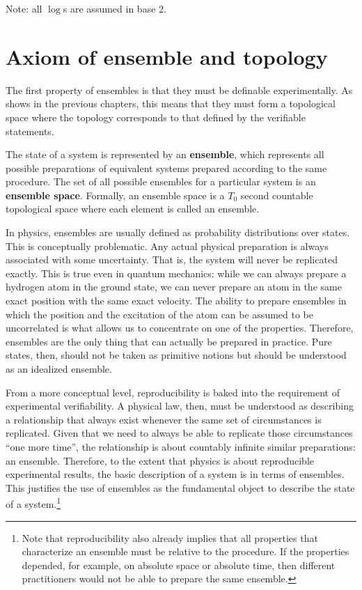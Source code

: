 Note: all $\log$s are assumed in base 2.

\section{Axiom of ensemble and topology}

The first property of ensembles is that they must be definable experimentally. As shows in the previous chapters, this means that they must form a topological space where the topology corresponds to that defined by the verifiable statements.

\begin{mathSection}
	\begin{axiom} 
		The state of a system is represented by an \textbf{ensemble}, which represents all possible preparations of equivalent systems prepared according to the same procedure. The set of all possible ensembles for a particular system is an \textbf{ensemble space}. Formally, an ensemble space is a $T_0$ second countable topological space where each element is called an ensemble.
	\end{axiom}
	
	\begin{justification}
		In physics, ensembles are usually defined as probability distributions over states. This is conceptually problematic. Any actual physical preparation is always associated with some uncertainty. That is, the system will never be replicated exactly. This is true even in quantum mechanics: while we can always prepare a hydrogen atom in the ground state, we can never prepare an atom in the same exact position with the same exact velocity. The ability to prepare ensembles in which the position and the excitation of the atom can be assumed to be uncorrelated is what allows us to concentrate on one of the properties. Therefore, ensembles are the only thing that can actually be prepared in practice. Pure states, then, should not be taken as primitive notions but should be understood as an idealized ensemble. 
		
		From a more conceptual level, reproducibility is baked into the requirement of experimental verifiability. A physical law, then, must be understood as describing a relationship that always exist whenever the same set of circumstances is replicated. Given that we need to always be able to replicate those circumstances ``one more time'', the relationship is about countably infinite similar preparations: an ensemble. Therefore, to the extent that physics is about reproducible experimental results, the basic description of a system is in terms of ensembles. This justifies the use of ensembles as the fundamental object to describe the state of a system.\footnote{Note that reproducibility also already implies that all properties that characterize an ensemble must be relative to the procedure. If the properties depended, for example, on absolute space or absolute time, then different practitioners would not be able to prepare the same ensemble.}
		

\end{justification}
\end{mathSection}
